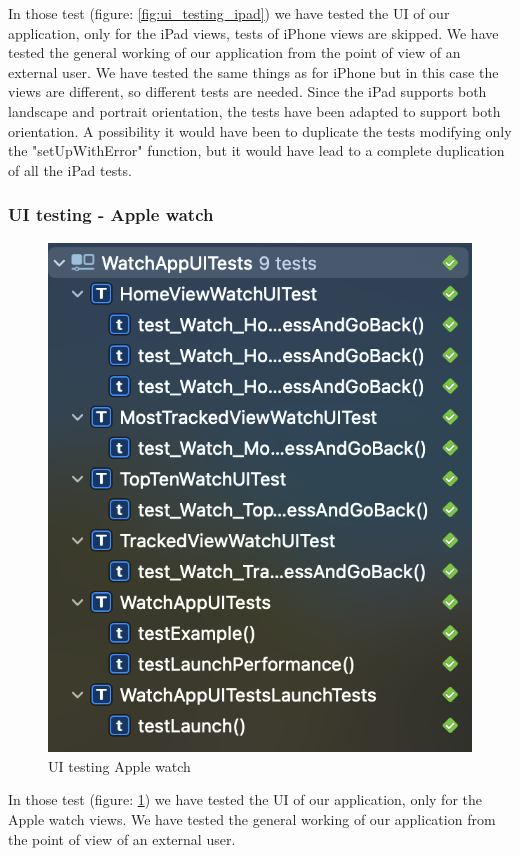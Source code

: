\FloatBarrier
In those test (figure: \ref{fig:ui_testing_ipad}) we have tested the UI of our application, only for the iPad views, tests of iPhone views are skipped.
We have tested the general working of our application from the point of view of an external user.
We have tested the same things as for iPhone but in this case the views are different, so different tests are needed.
Since the iPad supports both landscape and portrait orientation, the tests have been adapted to support both orientation.
A possibility it would have been to duplicate the tests modifying only the "setUpWithError" function, but it would have lead to a complete duplication of all the iPad tests.

\subsubsection{UI testing - Apple watch}
\begin{figure}[h!]
        \centering
        \includegraphics[scale=0.50]{images/testing/ui_testing_watch.png}
        \caption{UI testing Apple watch}
        \label{fig:ui_testing_watch}
\end{figure}
\FloatBarrier
In those test (figure: \ref{fig:ui_testing_watch}) we have tested the UI of our application, only for the Apple watch views.
We have tested the general working of our application from the point of view of an external user.

